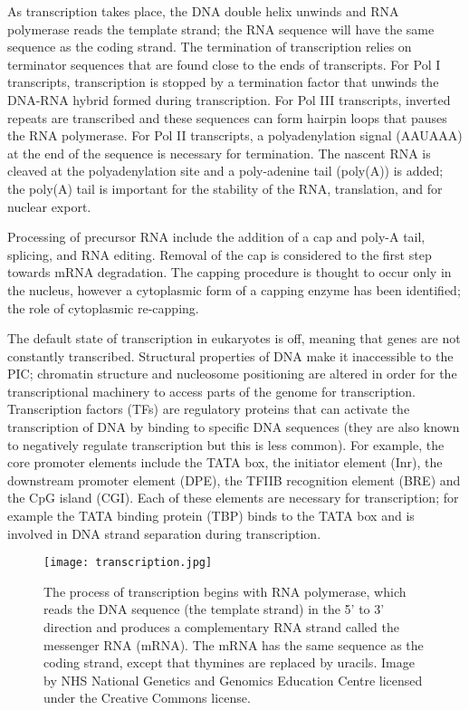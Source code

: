 As transcription takes place, the DNA double helix unwinds and RNA polymerase reads the template strand; the RNA sequence will have the same sequence as the coding strand. The termination of transcription relies on terminator sequences that are found close to the ends of transcripts. For Pol I transcripts, transcription is stopped by a termination factor that unwinds the DNA-RNA hybrid formed during transcription. For Pol III transcripts, inverted repeats are transcribed and these sequences can form hairpin loops that pauses the RNA polymerase. For Pol II transcripts, a polyadenylation signal (AAUAAA) at the end of the sequence is necessary for termination\cite{pmid3479794}. The nascent RNA is cleaved at the polyadenylation site and a poly-adenine tail (poly(A)) is added; the poly(A) tail is important for the stability of the RNA, translation, and for nuclear export.

Processing of precursor RNA include the addition of a cap and poly-A tail, splicing, and RNA editing. Removal of the cap is considered to the first step towards mRNA degradation. The capping procedure is thought to occur only in the nucleus, however a cytoplasmic form of a capping enzyme has been identified; the role of cytoplasmic re-capping.

The default state of transcription in eukaryotes is off, meaning that genes are not constantly transcribed. Structural properties of DNA make it inaccessible to the PIC; chromatin structure and nucleosome positioning are altered in order for the transcriptional machinery to access parts of the genome for transcription. Transcription factors (TFs) are regulatory proteins that can activate the transcription of DNA by binding to specific DNA sequences (they are also known to negatively regulate transcription but this is less common). For example, the core promoter elements include the TATA box, the initiator element (Inr), the downstream promoter element (DPE), the TFIIB recognition element (BRE) and the CpG island (CGI). Each of these elements are necessary for transcription; for example the TATA binding protein (TBP) binds to the TATA box and is involved in DNA strand separation during transcription.


\begin{figure}[h]
   \centering
   \texttt{[image: transcription.jpg]}
   \caption[DNA transcription]{The process of transcription begins with RNA polymerase, which reads the DNA sequence (the template strand) in the 5' to 3' direction and produces a complementary RNA strand called the messenger RNA (mRNA). The mRNA has the same sequence as the coding strand, except that thymines are replaced by uracils. Image by NHS National Genetics and Genomics Education Centre licensed under the Creative Commons license.}
   \label{fig:transcription}
\end{figure}

